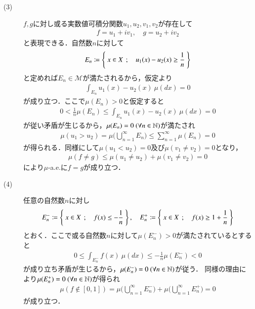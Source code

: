 \begin{prf}
\begin{description}
			\item[(3)] $f,g$に対し或る実数値可積分関数$u_1,u_2,v_1,v_2$が存在して
				\begin{align}
					f = u_1 + i v_1,
					\quad g = u_2 + i v_2
				\end{align}
				と表現できる．自然数$n$に対して
				\begin{align}
					E_n \coloneqq \left\{\ x \in X\ \, ; \quad u_1(x) - u_2(x) \geq \frac{1}{n}\ \right\}
				\end{align}
				と定めれば$E_n \in \mathcal{M}$が満たされるから，仮定より
				\begin{align}
					\int_{E_n} u_1(x) - u_2(x)\ \mu(dx) = 0
				\end{align}
				が成り立つ．ここで$\mu(E_n) > 0$と仮定すると
				\begin{align}
					0 < \frac{1}{n} \mu(E_n) \leq \int_{E_n} u_1(x) - u_2(x)\ \mu(dx) = 0
				\end{align}
				が従い矛盾が生じるから，$\mu(E_n) = 0\ (\forall n \in \N)$が満たされ
				\begin{align}
					\mu(u_1 > u_2) = \mu\biggl( \bigcup_{n=1}^{\infty} E_n \biggr) 
					\leq \sum_{n=1}^{\infty} \mu(E_n) = 0
				\end{align}
				が得られる．同様にして$\mu(u_1 < u_2) = 0$及び$\mu(v_1 \neq v_2) = 0$となり，
				\begin{align}
					\mu(f \neq g) \leq \mu(u_1 \neq u_2) + \mu(v_1 \neq v_2) = 0
				\end{align}
				により$\mu$-a.e.に$f = g$が成り立つ．
			
			\item[(4)] 任意の自然数$n$に対し
				\begin{align}
					E_n^- \coloneqq \left\{\ x \in X\ \, ; \quad f(x) \leq -\frac{1}{n}\ \right\},
					\quad E_n^+ \coloneqq \left\{\ x \in X\ \, ; \quad f(x) \geq 1 + \frac{1}{n}\ \right\}
				\end{align}
				とおく．ここで或る自然数$n$に対して$\mu(E_n^-) > 0$が満たされているとすると
				\begin{align}
					0 \leq \int_{E_n^-} f(x)\ \mu(dx)
					\leq -\frac{1}{n} \mu(E_n^-) < 0
				\end{align}
				が成り立ち矛盾が生じるから，$\mu(E_n^-) = 0\ (\forall n \in \N)$が従う．
				同様の理由により$\mu(E_n^+) = 0\ (\forall n \in \mathbb{N})$が得られ
				\begin{align}
					\mu(f \notin [0,1]) 
					= \mu\biggl( \bigcup_{n=1}^{\infty} E_n^- \biggr) 
						+ \mu\biggl( \bigcup_{n=1}^{\infty} E_n^+ \biggr) = 0
				\end{align}
				が成り立つ．
			\QED
		\end{description}
	\end{prf}
	
